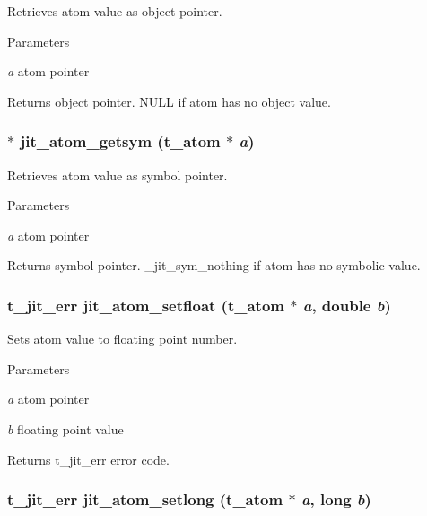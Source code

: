 Retrieves atom value as object pointer. 
\begin{DoxyParams}{Parameters}
\item[{\em a}]atom pointer\end{DoxyParams}
\begin{DoxyReturn}{Returns}
object pointer. NULL if atom has no object value. 
\end{DoxyReturn}
\hypertarget{group__atommod_ga73b81472812e4c5475d07d9914d84f89}{
\subsubsection[{jit\_\-atom\_\-getsym}]{ $\ast$ jit\_\-atom\_\-getsym ({\bf t\_\-atom} $\ast$ {\em a})}}
\label{group__atommod_ga73b81472812e4c5475d07d9914d84f89}


Retrieves atom value as symbol pointer. 
\begin{DoxyParams}{Parameters}
\item[{\em a}]atom pointer\end{DoxyParams}
\begin{DoxyReturn}{Returns}
symbol pointer. \_\-jit\_\-sym\_\-nothing if atom has no symbolic value. 
\end{DoxyReturn}
\hypertarget{group__atommod_gafa6fc51c30c70d54d6dd4af45042d3bd}{
\subsubsection[{jit\_\-atom\_\-setfloat}]{\setlength{\rightskip}{0pt plus 5cm}t\_\-jit\_\-err jit\_\-atom\_\-setfloat ({\bf t\_\-atom} $\ast$ {\em a}, \/  double {\em b})}}
\label{group__atommod_gafa6fc51c30c70d54d6dd4af45042d3bd}


Sets atom value to floating point number. 
\begin{DoxyParams}{Parameters}
\item[{\em a}]atom pointer \item[{\em b}]floating point value\end{DoxyParams}
\begin{DoxyReturn}{Returns}
t\_\-jit\_\-err error code. 
\end{DoxyReturn}
\hypertarget{group__atommod_ga3ba793bf8d970488f7fdee721fafcc16}{
\subsubsection[{jit\_\-atom\_\-setlong}]{\setlength{\rightskip}{0pt plus 5cm}t\_\-jit\_\-err jit\_\-atom\_\-setlong ({\bf t\_\-atom} $\ast$ {\em a}, \/  long {\em b})}}
\label{group__atommod_ga3ba793bf8d970488f7fdee721fafcc16}


